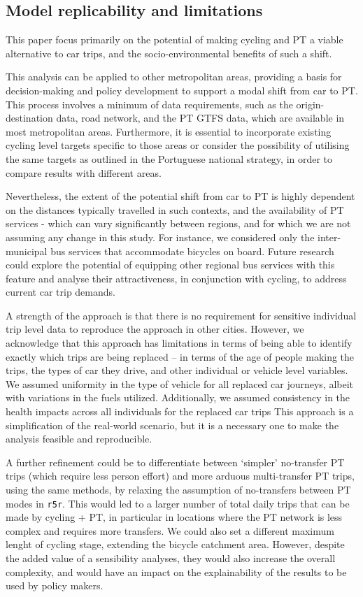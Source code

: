 \documentclass[review, doubleblind, 3p,
authoryear]{elsarticle} %
\begin{document}
\subsection{Model replicability and
limitations}\label{model-replicability-and-limitations}

This paper focus primarily on the potential of making cycling and PT a
viable alternative to car trips, and the socio-environmental benefits of
such a shift.

This analysis can be applied to other metropolitan areas, providing a
basis for decision-making and policy development to support a modal
shift from car to PT. This process involves a minimum of data
requirements, such as the origin-destination data, road network, and the
PT GTFS data, which are available in most metropolitan areas.
Furthermore, it is essential to incorporate existing cycling level
targets specific to those areas or consider the possibility of utilising
the same targets as outlined in the Portuguese national strategy, in
order to compare results with different areas.

Nevertheless, the extent of the potential shift from car to PT is highly
dependent on the distances typically travelled in such contexts, and the
availability of PT services - which can vary significantly between
regions, and for which we are not assuming any change in this study. For
instance, we considered only the inter-municipal bus services that
accommodate bicycles on board. Future research could explore the
potential of equipping other regional bus services with this feature and
analyse their attractiveness, in conjunction with cycling, to address
current car trip demands.

A strength of the approach is that there is no requirement for sensitive
individual trip level data to reproduce the approach in other cities.
However, we acknowledge that this approach has limitations in terms of
being able to identify exactly which trips are being replaced -- in
terms of the age of people making the trips, the types of car they
drive, and other individual or vehicle level variables. We assumed
uniformity in the type of vehicle for all replaced car journeys, albeit
with variations in the fuels utilized. Additionally, we assumed
consistency in the health impacts across all individuals for the
replaced car trips This approach is a simplification of the real-world
scenario, but it is a necessary one to make the analysis feasible and
reproducible.

A further refinement could be to differentiate between `simpler'
no-transfer PT trips (which require less person effort) and more arduous
multi-transfer PT trips, using the same methods, by relaxing the
assumption of no-transfers between PT modes in \texttt{r5r}. This would
led to a larger number of total daily trips that can be made by cycling
+ PT, in particular in locations where the PT network is less complex
and requires more transfers. We could also set a different maximum
lenght of cycling stage, extending the bicycle catchment area. However,
despite the added value of a sensibility analyses, they would also
increase the overall complexity, and would have an impact on the
explainability of the results to be used by policy makers.
\end{document}
